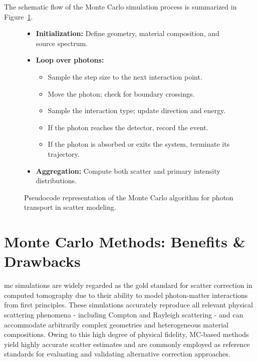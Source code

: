 The schematic flow of the Monte Carlo simulation process is summarized in
Figure~\ref{fig:photon-transport-pseudocode}.

\begin{figure}[H]
\centering
\begin{tcolorbox}[colback=white!95!gray, colframe=black!60, width=0.9\textwidth, title=Monte Carlo Photon Transport Algorithm, fonttitle=\bfseries]
\begin{itemize}[leftmargin=1.5em]
    \item \textbf{Initialization:} Define geometry, material composition, and source
    spectrum.
    
    \item \textbf{Loop over photons:}
    \begin{itemize}
        \item Sample the step size to the next interaction point.
        \item Move the photon; check for boundary crossings.
        \item Sample the interaction type; update direction and energy.
        \item If the photon reaches the detector, record the event.
        \item If the photon is absorbed or exits the system, terminate its trajectory.
    \end{itemize}
    
    \item \textbf{Aggregation:} Compute both scatter and primary intensity distributions.
\end{itemize}
\end{tcolorbox}
\caption{Pseudocode representation of the Monte Carlo algorithm for photon transport in scatter modeling.}
\label{fig:photon-transport-pseudocode}
\end{figure}


\section{Monte Carlo Methods: Benefits \& Drawbacks}

\ac{mc} simulations are widely regarded as the gold standard for scatter
correction in computed tomography due to their ability to model photon-matter
interactions from first principles. These simulations accurately reproduce all
relevant physical scattering phenomena - including Compton and Rayleigh
scattering - and can accommodate arbitrarily complex geometries and
heterogeneous material compositions. Owing to this high degree of physical
fidelity, MC-based methods yield highly accurate scatter estimates and are
commonly employed as reference standards for evaluating and validating
alternative correction approaches.

